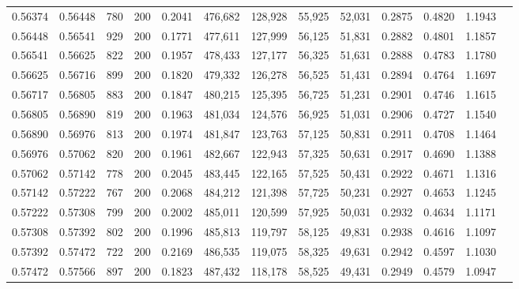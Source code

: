 \begin{tabular}{rrrrrrrrrrrrr}
0.56374 & 0.56448 &   780 & 200 &                                     0.2041 & 476,682 & 128,928 &  55,925 &  52,031 & 0.2875 & 0.4820 & 1.1943 \\
0.56448 & 0.56541 &   929 & 200 &                                     0.1771 & 477,611 & 127,999 &  56,125 &  51,831 & 0.2882 & 0.4801 & 1.1857 \\
0.56541 & 0.56625 &   822 & 200 &                                     0.1957 & 478,433 & 127,177 &  56,325 &  51,631 & 0.2888 & 0.4783 & 1.1780 \\
0.56625 & 0.56716 &   899 & 200 &                                     0.1820 & 479,332 & 126,278 &  56,525 &  51,431 & 0.2894 & 0.4764 & 1.1697 \\
0.56717 & 0.56805 &   883 & 200 &                                     0.1847 & 480,215 & 125,395 &  56,725 &  51,231 & 0.2901 & 0.4746 & 1.1615 \\
0.56805 & 0.56890 &   819 & 200 &                                     0.1963 & 481,034 & 124,576 &  56,925 &  51,031 & 0.2906 & 0.4727 & 1.1540 \\
0.56890 & 0.56976 &   813 & 200 &                                     0.1974 & 481,847 & 123,763 &  57,125 &  50,831 & 0.2911 & 0.4708 & 1.1464 \\
0.56976 & 0.57062 &   820 & 200 &                                     0.1961 & 482,667 & 122,943 &  57,325 &  50,631 & 0.2917 & 0.4690 & 1.1388 \\
0.57062 & 0.57142 &   778 & 200 &                                     0.2045 & 483,445 & 122,165 &  57,525 &  50,431 & 0.2922 & 0.4671 & 1.1316 \\
0.57142 & 0.57222 &   767 & 200 &                                     0.2068 & 484,212 & 121,398 &  57,725 &  50,231 & 0.2927 & 0.4653 & 1.1245 \\
0.57222 & 0.57308 &   799 & 200 &                                     0.2002 & 485,011 & 120,599 &  57,925 &  50,031 & 0.2932 & 0.4634 & 1.1171 \\
0.57308 & 0.57392 &   802 & 200 &                                     0.1996 & 485,813 & 119,797 &  58,125 &  49,831 & 0.2938 & 0.4616 & 1.1097 \\
0.57392 & 0.57472 &   722 & 200 &                                     0.2169 & 486,535 & 119,075 &  58,325 &  49,631 & 0.2942 & 0.4597 & 1.1030 \\
0.57472 & 0.57566 &   897 & 200 &                                     0.1823 & 487,432 & 118,178 &  58,525 &  49,431 & 0.2949 & 0.4579 & 1.0947 \\

\end{tabular}

